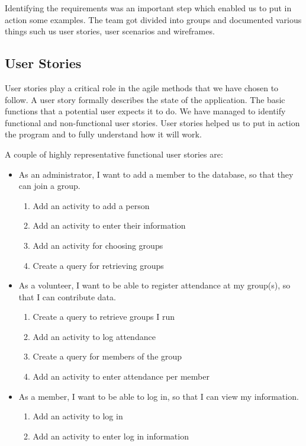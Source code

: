 \documentclass{l3proj}
\begin{document}
Identifying the requirements was an important step which enabled us to put in action some examples. The team got divided into groups and documented various things such us user stories, user scenarios and wireframes. 

\subsection{User Stories}
\label{user_stories}

User stories play a critical role in the agile methods that we have chosen to follow. A user story formally describes the state of the application. The basic functions that a potential user expects it to do. We have managed to identify functional and non-functional user stories. User stories helped us to put in action the program and to fully understand how it will work.

A couple of highly representative functional user stories are:
\begin{itemize}

\item As an administrator, I want to add a member to the database, so that they can join a group.

	\begin{enumerate}
  	\item Add an activity to add a person
  	
	\item Add an activity to enter their information

	\item Add an activity for choosing groups

	\item Create a query for retrieving groups
	\end{enumerate}
\item As a volunteer, I want to be able to register attendance at my group(s), so that I can contribute data.

	\begin{enumerate}
	\item Create a query to retrieve groups I run
	
	\item Add an activity to log attendance
	
	\item Create a query for members of the group
	
	\item Add an activity to enter attendance per member
	
	\end{enumerate}

\item As a member, I want to be able to log in, so that I can view my information.

	\begin{enumerate}
	
	\item Add an activity to log in
	\item Add an activity to enter log in information
	
	\end{enumerate}

\end{itemize}
\end{document}
